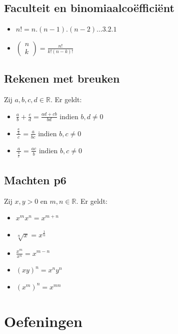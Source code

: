 \documentclass[11pt]{article}
\newcommand{\RR}{\ensuremath{\mathbb{R}}}
\newcommand{\ds}{\displaystyle}
\begin{document}
{\subsection{Faculteit en binomiaalco\"effici\"ent}
\begin{itemize}
\item $n! = n.(n-1).(n-2) \ldots  3.2.1$
\item $\displaystyle \left( \begin{array}{c} n \\ k \end{array} \right) = \frac{n!}{k! (n-k)!}$
\end{itemize}

\subsection{Rekenen met breuken}
Zij $a,b,c,d\in \RR$. Er geldt:
\begin{itemize}
\item $\ds{\frac{a}{b}+\frac{c}{d}}=\ds{\frac{ad+cb}{bd}}$ \hspace{3mm}   indien $b,d \neq 0$
\item $\ds{\frac{\frac{a}{b}}{\ c\ }}=\ds{\frac{a}{bc}}$ \hspace{3mm}   indien $b,c \neq 0$
\item $\ds{\frac{a}{\ \frac{b}{c}\ }}=\ds{\frac{ac}{b}}$ \hspace{3mm}   indien $b,c \neq 0$
\end{itemize}
\subsection{Machten p6}
Zij $x,y>0$ en $m,n\in\RR$. Er geldt:

\begin{itemize}
\item $\ds{x^{m}x^{n}}= \ds{x^{m+n}}$
\item $\ds{\sqrt[n] x = x^{\frac1n}}$
\item
$\ds{\frac{x^{m}}{x^{n}}}= \ds{x^{m-n}}$
\item
$\ds{(xy)^n}=\ds{x^ny^n}$
\item
$\ds{\left(x^{m}\right)^{n}}= \ds{x^{mn}}$

\end{itemize}

\section{Oefeningen}

}
\end{document}
